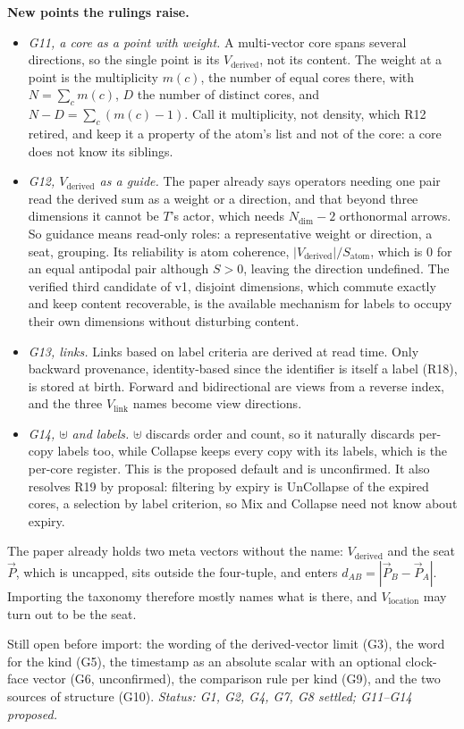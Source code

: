 \documentclass[11pt]{article}
\begin{document}
\textbf{New points the rulings raise.}
\begin{itemize}
\item \emph{G11, a core as a point with weight.} A multi-vector core
spans several directions, so the single point is its $V_{\text{derived}}$,
not its content. The weight at a point is the multiplicity $m(c)$, the
number of equal cores there, with $N=\sum_cm(c)$, $D$ the number of
distinct cores, and $N-D=\sum_c(m(c)-1)$. Call it multiplicity, not
density, which R12 retired, and keep it a property of the atom's list and
not of the core: a core does not know its siblings.
\item \emph{G12, $V_{\text{derived}}$ as a guide.} The paper already says
operators needing one pair read the derived sum as a weight or a
direction, and that beyond three dimensions it cannot be $T$'s actor,
which needs $N_{\mathrm{dim}}-2$ orthonormal arrows. So guidance means
read-only roles: a representative weight or direction, a seat, grouping.
Its reliability is atom coherence, $|V_{\text{derived}}|/S_{\text{atom}}$,
which is $0$ for an equal antipodal pair although $S>0$, leaving the
direction undefined. The verified third candidate of v1, disjoint
dimensions, which commute exactly and keep content recoverable, is the
available mechanism for labels to occupy their own dimensions without
disturbing content.
\item \emph{G13, links.} Links based on label criteria are derived at read
time. Only backward provenance, identity-based since the identifier is
itself a label (R18), is stored at birth. Forward and bidirectional are
views from a reverse index, and the three $V_{\text{link}}$ names become
view directions.
\item \emph{G14, $\uplus$ and labels.} $\uplus$ discards order and count,
so it naturally discards per-copy labels too, while Collapse keeps every
copy with its labels, which is the per-core register. This is the proposed
default and is unconfirmed. It also resolves R19 by proposal: filtering by
expiry is UnCollapse of the expired cores, a selection by label criterion,
so Mix and Collapse need not know about expiry.
\end{itemize}
The paper already holds two meta vectors without the name: $V_{\text{derived}}$
and the seat $\vec P$, which is uncapped, sits outside the four-tuple, and
enters $d_{AB}=|\vec P_B-\vec P_A|$. Importing the taxonomy therefore
mostly names what is there, and $V_{\text{location}}$ may turn out to be
the seat.

Still open before import: the wording of the derived-vector limit (G3),
the word for the kind (G5), the timestamp as an absolute scalar with an
optional clock-face vector (G6, unconfirmed), the comparison rule per kind
(G9), and the two sources of structure (G10).
\emph{Status: G1, G2, G4, G7, G8 settled; G11--G14 proposed.}
\end{document}
